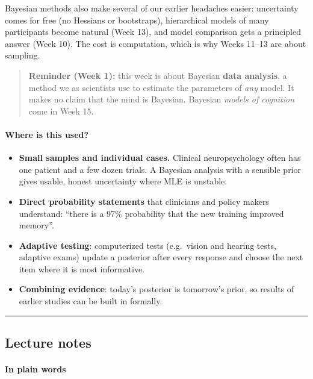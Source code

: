 Bayesian methods also make several of our earlier headaches easier:
uncertainty comes for free (no Hessians or bootstraps), hierarchical
models of many participants become natural (Week 13), and model
comparison gets a principled answer (Week 10). The cost is computation,
which is why Weeks 11--13 are about sampling.

\begin{quote}
\textbf{Reminder (Week 1):} this week is about Bayesian \textbf{data
analysis}, a method we as scientists use to estimate the parameters of
\emph{any} model. It makes no claim that the mind is Bayesian. Bayesian
\emph{models of cognition} come in Week 15.
\end{quote}

\paragraph{Where is this used?}

\begin{itemize}
\tightlist
\item
  \textbf{Small samples and individual cases.} Clinical neuropsychology
  often has one patient and a few dozen trials. A Bayesian analysis with
  a sensible prior gives usable, honest uncertainty where MLE is
  unstable.
\item
  \textbf{Direct probability statements} that clinicians and policy
  makers understand: ``there is a 97\% probability that the new training
  improved memory''.
\item
  \textbf{Adaptive testing}: computerized tests (e.g.~vision and hearing
  tests, adaptive exams) update a posterior after every response and
  choose the next item where it is most informative.
\item
  \textbf{Combining evidence}: today's posterior is tomorrow's prior, so
  results of earlier studies can be built in formally.
\end{itemize}

\begin{center}\rule{0.5\linewidth}{0.5pt}\end{center}


\subsection{Lecture notes}

\paragraph{In plain words}

